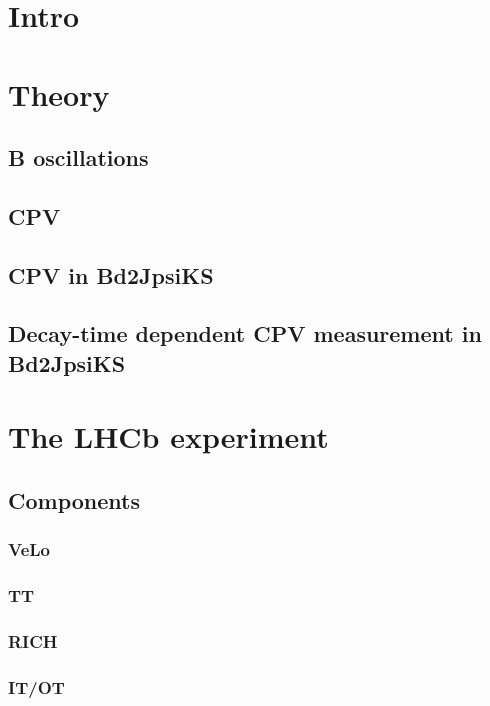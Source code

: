 
% 

\chapter{Intro}


\chapter{Theory}
\section{B oscillations}
\section{CPV}
\section{CPV in Bd2JpsiKS}
\section{Decay-time dependent CPV measurement in Bd2JpsiKS}

\chapter{The LHCb experiment}
\section{Components}
\subsection{VeLo}
\subsection{TT}
\subsection{RICH}
\subsection{IT/OT}
